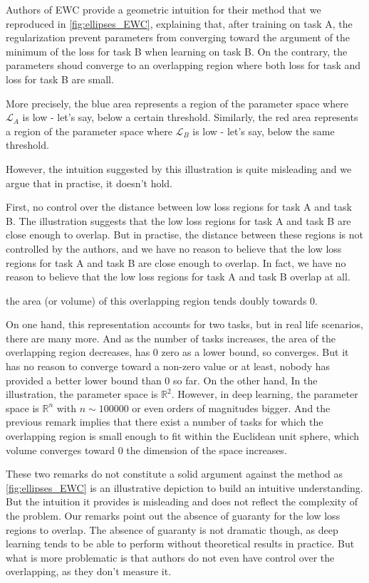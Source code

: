 \documentclass[11pt]{article}
\begin{document}
\vspace{1mm}
\noindent
Authors of EWC provide a geometric intuition for their method that we reproduced in \ref{fig:ellipses_EWC}, explaining that, after training on task A, the regularization prevent parameters from converging toward the argument of the minimum of the loss for task B when learning on task B. On the contrary, the parameters shoud converge to an overlapping region where both loss for task and loss for task B are small.

More precisely, the blue area represents a region of the parameter space where $\mathcal{L}_A$ is low - let's say, below a certain threshold. Similarly, the red area represents a region of the parameter space where $\mathcal{L}_B$ is low - let's say, below the same threshold. 

However, the intuition suggested by this illustration is quite misleading and we argue that in practise, it doesn't hold.

\vspace{1mm}
\noindent
First, no control over the distance between low loss regions for task A and task B. The illustration suggests that the low loss regions for task A and task B are close enough to overlap. But in practise, the distance between these regions is not controlled by the authors, and we have no reason to believe that the low loss regions for task A and task B are close enough to overlap. In fact, we have no reason to believe that the low loss regions for task A and task B overlap at all.

\vspace{1mm}
\noindent
the area (or volume) of this overlapping region tends doubly towards 0.

On one hand, this representation accounts for two tasks, but in real life scenarios, there are many more. And as the number of tasks increases, the area of the overlapping region decreases, has 0 zero as a lower bound, so converges. But it has no reason to converge toward a non-zero value or at least, nobody has provided a better lower bound than 0 so far.
On the other hand, In the illustration, the parameter space is $\mathbb{R}^2$. However, in deep learning, the parameter space is $\mathbb{R}^n$ with $n \sim 100 000$ or even orders of magnitudes bigger. And the previous remark implies that there exist a number of tasks for which the overlapping region is small enough to fit within the Euclidean unit sphere, which volume converges toward 0 the dimension of the space increases. 

These two remarks do not constitute a solid argument against the method as \ref{fig:ellipses_EWC} is an illustrative depiction to build an intuitive understanding. But the intuition it provides is misleading and does not reflect the complexity of the problem. Our remarks point out the absence of guaranty for the low loss regions to overlap. The absence of guaranty is not dramatic though, as deep learning tends to be able to perform without theoretical results in practice. But what is more problematic is that authors do not even have control over the overlapping, as they don't measure it.
\end{document}
